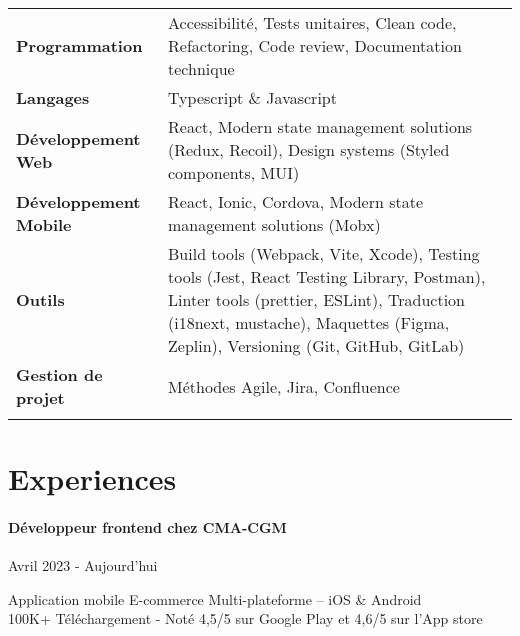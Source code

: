 \documentclass{article}
\begin{document}
\begin{tabularx}{\textwidth}{@{}lX@{}}

  \textbf{Programmation} & Accessibilité, Tests unitaires, Clean code, Refactoring, Code review, Documentation technique \\
  \addlinespace[5pt] %

  \textbf{Langages} & Typescript \& Javascript \\
  \addlinespace[5pt] %

  \textbf{Développement Web} & React, Modern state management solutions (Redux, Recoil), Design systems (Styled components, MUI) \\
  \addlinespace[5pt] %

  \textbf{Développement Mobile} & React, Ionic, Cordova, Modern state management solutions (Mobx) \\
  \addlinespace[5pt] %

  \textbf{Outils} & Build tools (Webpack, Vite, Xcode), Testing tools (Jest, React Testing Library, Postman), Linter tools (prettier, ESLint), Traduction (i18next, mustache), Maquettes (Figma, Zeplin), Versioning (Git, GitHub, GitLab) \\
  \addlinespace[5pt] %

  \textbf{Gestion de projet} & Méthodes Agile, Jira, Confluence \\
  \addlinespace[5pt] %
  
\end{tabularx}

\vspace{4ex}
\hrulefill
\section*{Experiences}

\paragraph{Développeur frontend chez CMA-CGM}\hspace*{\fill}Avril 2023 - Aujourd'hui

\noindent
Application mobile E-commerce Multi-plateforme – iOS \& Android \\
100K+ Téléchargement - Noté 4,5/5 sur Google Play et 4,6/5 sur l'App store
\end{document}
